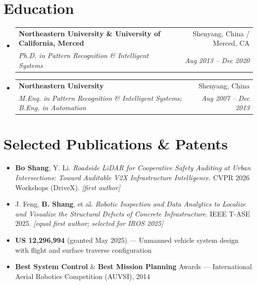 \documentclass[letterpaper,10pt]{article}
\makeatletter
\newcommand{\resumeBullet}[1]{
  \item\small{#1 \vspace{-2pt}}
}
\newcommand{\resumeSubheading}[4]{
  \vspace{-1pt}\item
    \begin{tabular*}{0.97\textwidth}{l@{\extracolsep{\fill}}r}
      \textbf{#1} & #2 \\
      \textit{\small#3} & \textit{\small #4} \\
    \end{tabular*}\vspace{-5pt}
}
\newcommand{\resumeSubHeadingListStart}{\begin{itemize}[leftmargin=*]}
\newcommand{\resumeSubHeadingListEnd}{\end{itemize}}
\makeatother
\begin{document}
\section{Education}
  \resumeSubHeadingListStart
    \resumeSubheading
      {Northeastern University \& University of California, Merced}{Shenyang, China / Merced, CA}
      {Ph.D. in Pattern Recognition \& Intelligent Systems}{Aug 2013 -- Dec 2020}
    \resumeSubheading
      {Northeastern University}{Shenyang, China}
      {M.Eng. in Pattern Recognition \& Intelligent Systems; B.Eng. in Automation}{Aug 2007 -- Dec 2013}
  \resumeSubHeadingListEnd

\section{Selected Publications \& Patents}
  \resumeSubHeadingListStart
    \resumeBullet{\textbf{Bo Shang}, Y. Li. \textit{Roadside LiDAR for Cooperative Safety Auditing at Urban Intersections: Toward Auditable V2X Infrastructure Intelligence.} CVPR 2026 Workshops (DriveX). \textit{[first author]}}
    \resumeBullet{J. Feng, \textbf{B. Shang}, et al. \textit{Robotic Inspection and Data Analytics to Localize and Visualize the Structural Defects of Concrete Infrastructure.} IEEE T-ASE 2025. \textit{[equal first author; selected for IROS 2025]}}
    \resumeBullet{\textbf{US 12,296,994} (granted May 2025) --- Unmanned vehicle system design with flight and surface traverse configuration}
    \resumeBullet{\textbf{Best System Control} \& \textbf{Best Mission Planning} Awards --- International Aerial Robotics Competition (AUVSI), 2014}
  \resumeSubHeadingListEnd
\end{document}
